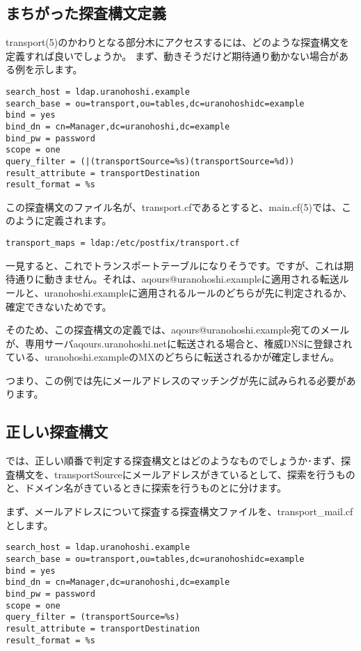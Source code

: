 \subsection{まちがった探査構文定義}

transport(5)のかわりとなる部分木にアクセスするには、どのような探査構文を定義すれば良いでしょうか。
まず、動きそうだけど期待通り動かない場合がある例を示します。

\begin{verbatim}
search_host = ldap.uranohoshi.example
search_base = ou=transport,ou=tables,dc=uranohoshidc=example
bind = yes
bind_dn = cn=Manager,dc=uranohoshi,dc=example
bind_pw = password
scope = one
query_filter = (|(transportSource=%s)(transportSource=%d))
result_attribute = transportDestination
result_format = %s
\end{verbatim}

この探査構文のファイル名が、transport.cfであるとすると、main.cf(5)では、このように定義されます。

\begin{verbatim}
transport_maps = ldap:/etc/postfix/transport.cf
\end{verbatim}

一見すると、これでトランスポートテーブルになりそうです。ですが、これは期待通りに動きません。それは、aqours@uranohoshi.exampleに適用される転送ルールと、uranohoshi.exampleに適用されるルールのどちらが先に判定されるか、確定できないためです。

そのため、この探査構文の定義では、aqours@uranohoshi.example宛てのメールが、専用サーバaqours.uranohoshi.netに転送される場合と、権威DNSに登録されている、uranohoshi.exampleのMXのどちらに転送されるかが確定しません。

つまり、この例では先にメールアドレスのマッチングが先に試みられる必要があります。

\subsection{正しい探査構文}

では、正しい順番で判定する探査構文とはどのようなものでしょうか･まず、探査構文を、transportSourceにメールアドレスがきているとして、探索を行うものと、ドメイン名がきているときに探索を行うものとに分けます。

まず、メールアドレスについて探査する探査構文ファイルを、transport\_mail.cfとします。

\begin{verbatim}
search_host = ldap.uranohoshi.example
search_base = ou=transport,ou=tables,dc=uranohoshidc=example
bind = yes
bind_dn = cn=Manager,dc=uranohoshi,dc=example
bind_pw = password
scope = one
query_filter = (transportSource=%s)
result_attribute = transportDestination
result_format = %s
\end{verbatim}

